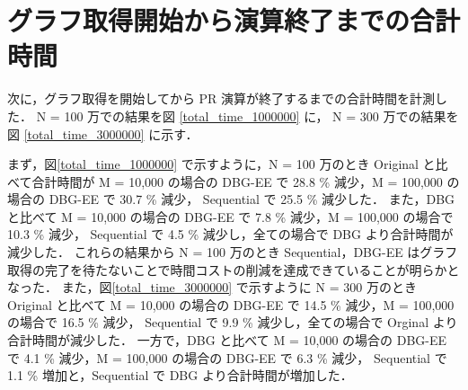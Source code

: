 \section{グラフ取得開始から演算終了までの合計時間}
\label{total_time}
次に，グラフ取得を開始してから PR 演算が終了するまでの合計時間を計測した．
N = 100 万での結果を図 \ref{total_time_1000000} に，
N = 300 万での結果を図 \ref{total_time_3000000} に示す．

まず，図\ref{total_time_1000000} で示すように，N = 100 万のとき Original と比べて合計時間が M = 10,000 の場合の DBG-EE で 28.8 \% 減少，M = 100,000 の場合の DBG-EE で 30.7 \% 減少， 
Sequential で 25.5 \% 減少した．
また，DBG と比べて M = 10,000 の場合の DBG-EE で 7.8 \% 減少，M = 100,000 の場合で 10.3 \% 減少， 
Sequential で 4.5 \% 減少し，全ての場合で DBG より合計時間が減少した．
これらの結果から N = 100 万のとき Sequential，DBG-EE はグラフ取得の完了を待たないことで時間コストの削減を達成できていることが明らかとなった．
また，図\ref{total_time_3000000} で示すように N = 300 万のとき Original と比べて M = 10,000 の場合の DBG-EE で 14.5 \% 減少，M = 100,000 の場合で 16.5 \% 減少， 
Sequential で 9.9 \% 減少し，全ての場合で Orginal より合計時間が減少した．
一方で，DBG と比べて M = 10,000 の場合の DBG-EE で 4.1 \% 減少，M = 100,000 の場合の DBG-EE で 6.3 \% 減少，
Sequential で 1.1 \% 増加と，Sequential で DBG より合計時間が増加した．

